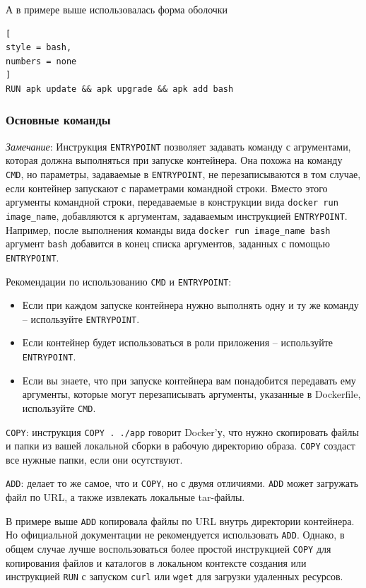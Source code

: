 \documentclass[%
	11pt,
	a4paper,
	utf8,
		]{article}
\begin{document}
А в примере выше использовалась форма оболочки 
\begin{lstlisting}[
style = bash,
numbers = none	
]
RUN apk update && apk upgrade && apk add bash
\end{lstlisting}

\subsubsection{Основные команды}

\emph{Замечание}: Инструкция \verb*|ENTRYPOINT| позволяет задавать команду с агрументами, которая должна выполняться при запуске контейнера. Она похожа на команду \verb*|CMD|, но параметры, задаваемые в \verb*|ENTRYPOINT|, не перезаписываются в том случае, если контейнер запускают с параметрами командной строки. Вместо этого аргументы командной строки, передаваемые в конструкции вида \verb*|docker run image_name|, добавляются к аргументам, задаваемым инструкцией \verb*|ENTRYPOINT|. Например, после выполнения команды вида \verb*|docker run image_name bash| аргумент \verb*|bash| добавится в конец списка аргументов, заданных с помощью \verb*|ENTRYPOINT|.

Рекомендации по использованию \verb*|CMD| и \verb*|ENTRYPOINT|:
\begin{itemize}
	\item Если при каждом запуске контейнера нужно выполнять одну и ту же команду -- используйте \verb*|ENTRYPOINT|.
	
	\item Если контейнер будет использоваться в роли приложения -- используйте \verb*|ENTRYPOINT|.
	
	\item Если вы знаете, что при запуске контейнера вам понадобится передавать ему аргументы, которые могут перезаписывать аргументы, указанные в Dockerfile, используйте \verb*|CMD|.
\end{itemize}

\texttt{COPY}: инструкция \verb|COPY . ./app| говорит Docker'у, что нужно скопировать файлы и папки из вашей локальной сборки в рабочую директорию образа. \texttt{COPY} создаст все нужные папки, если они осутствуют.

\texttt{ADD}: делает то же самое, что и \texttt{COPY}, но с двумя отличиями. \texttt{ADD} может загружать файл по URL, а также извлекать локальные tar-файлы.

В примере выше \texttt{ADD} копировала файлы по URL внутрь директории контейнера. Но официальной документации не рекомендуется использовать \texttt{ADD}. Однако, в общем случае лучше воспользоваться более простой инструкцией \texttt{COPY} для копирования файлов и каталогов в локальном контексте создания или инструкцией \texttt{RUN} с запуском \texttt{curl} или \texttt{wget} для загрузки удаленных ресурсов.
\end{document}
